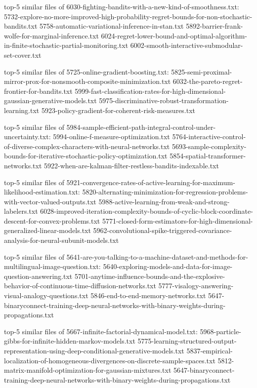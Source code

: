 \documentclass[11pt]{article}
\begin{document}
top-5 similar files of
6030-fighting-bandits-with-a-new-kind-of-smoothness.txt:
5732-explore-no-more-improved-high-probability-regret-bounds-for-non-stochastic-bandits.txt
5758-automatic-variational-inference-in-stan.txt
5892-barrier-frank-wolfe-for-marginal-inference.txt
6024-regret-lower-bound-and-optimal-algorithm-in-finite-stochastic-partial-monitoring.txt
6002-smooth-interactive-submodular-set-cover.txt

top-5 similar files of 5725-online-gradient-boosting.txt:
5825-semi-proximal-mirror-prox-for-nonsmooth-composite-minimization.txt
6032-the-pareto-regret-frontier-for-bandits.txt
5999-fast-classification-rates-for-high-dimensional-gaussian-generative-models.txt
5975-discriminative-robust-transformation-learning.txt
5923-policy-gradient-for-coherent-risk-measures.txt

top-5 similar files of
5984-sample-efficient-path-integral-control-under-uncertainty.txt:
5994-online-f-measure-optimization.txt
5764-interactive-control-of-diverse-complex-characters-with-neural-networks.txt
5693-sample-complexity-bounds-for-iterative-stochastic-policy-optimization.txt
5854-spatial-transformer-networks.txt
5922-when-are-kalman-filter-restless-bandits-indexable.txt

top-5 similar files of
5921-convergence-rates-of-active-learning-for-maximum-likelihood-estimation.txt:
5820-alternating-minimization-for-regression-problems-with-vector-valued-outputs.txt
5988-active-learning-from-weak-and-strong-labelers.txt
6028-improved-iteration-complexity-bounds-of-cyclic-block-coordinate-descent-for-convex-problems.txt
5771-closed-form-estimators-for-high-dimensional-generalized-linear-models.txt
5962-convolutional-spike-triggered-covariance-analysis-for-neural-subunit-models.txt

top-5 similar files of
5641-are-you-talking-to-a-machine-dataset-and-methods-for-multilingual-image-question.txt:
5640-exploring-models-and-data-for-image-question-answering.txt
5701-anytime-influence-bounds-and-the-explosive-behavior-of-continuous-time-diffusion-networks.txt
5777-visalogy-answering-visual-analogy-questions.txt
5846-end-to-end-memory-networks.txt
5647-binaryconnect-training-deep-neural-networks-with-binary-weights-during-propagations.txt

top-5 similar files of 5667-infinite-factorial-dynamical-model.txt:
5968-particle-gibbs-for-infinite-hidden-markov-models.txt
5775-learning-structured-output-representation-using-deep-conditional-generative-models.txt
5837-empirical-localization-of-homogeneous-divergences-on-discrete-sample-spaces.txt
5812-matrix-manifold-optimization-for-gaussian-mixtures.txt
5647-binaryconnect-training-deep-neural-networks-with-binary-weights-during-propagations.txt
\end{document}
